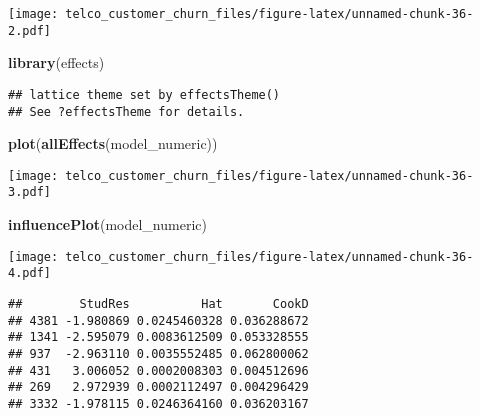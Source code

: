 \documentclass[
  a4paper]{article}
\newenvironment{Shaded}{\begin{snugshade}}{\end{snugshade}}
\newcommand{\FunctionTok}[1]{\textcolor[rgb]{0.13,0.29,0.53}{\textbf{#1}}}
\newcommand{\NormalTok}[1]{#1}
\begin{document}
\texttt{[image: telco\_customer\_churn\_files/figure-latex/unnamed-chunk-36-2.pdf]}

\begin{Shaded}
\begin{Highlighting}[]
\FunctionTok{library}\NormalTok{(effects)}
\end{Highlighting}
\end{Shaded}

\begin{verbatim}
## lattice theme set by effectsTheme()
## See ?effectsTheme for details.
\end{verbatim}

\begin{Shaded}
\begin{Highlighting}[]
\FunctionTok{plot}\NormalTok{(}\FunctionTok{allEffects}\NormalTok{(model\_numeric))}
\end{Highlighting}
\end{Shaded}

\texttt{[image: telco\_customer\_churn\_files/figure-latex/unnamed-chunk-36-3.pdf]}

\begin{Shaded}
\begin{Highlighting}[]
\FunctionTok{influencePlot}\NormalTok{(model\_numeric)}
\end{Highlighting}
\end{Shaded}

\texttt{[image: telco\_customer\_churn\_files/figure-latex/unnamed-chunk-36-4.pdf]}

\begin{verbatim}
##        StudRes          Hat       CookD
## 4381 -1.980869 0.0245460328 0.036288672
## 1341 -2.595079 0.0083612509 0.053328555
## 937  -2.963110 0.0035552485 0.062800062
## 431   3.006052 0.0002008303 0.004512696
## 269   2.972939 0.0002112497 0.004296429
## 3332 -1.978115 0.0246364160 0.036203167
\end{verbatim}
\end{document}

